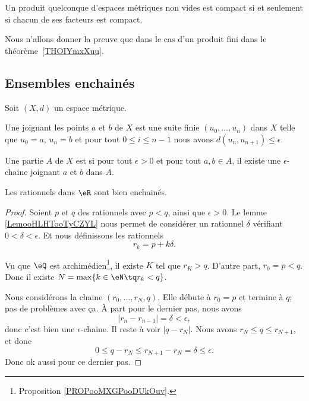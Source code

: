 \begin{theorem}[Tykhonov]\label{ThoFWXsQOZ}
    Un produit quelconque d'espaces métriques non vides est compact si et seulement si chacun de ses facteurs est compact.
\end{theorem}
Nous n'allons donner la preuve que dans le cas d'un produit fini dans le théorème~\ref{THOIYmxXuu}.

\subsection{Ensembles enchainés}

Soit \( (X,d)\) un espace métrique.
\begin{definition}
    Une  joignant les points \( a\) et \( b\) de \( X\) est une suite finie \( (u_0,\ldots, u_n)\) dans \( X\) telle que \( u_0=a\), \( u_n=b\) et pour tout \( 0\leq i\leq n-1\) nous avons \( d(u_n,u_{n+1})\leq \epsilon\).

    Une partie \( A\) de \( X\) est  si pour tout \( \epsilon>0\) et pour tout \( a,b\in A\), il existe une \( \epsilon\)-chaine joignant \( a\) et \( b\) dans $A$.
\end{definition}


\begin{lemma}
    Les rationnels dans \( \eR\) sont bien enchainés.
\end{lemma}

\begin{proof}
    Soient \( p\) et \( q\) des rationnels avec \( p<q\), ainsi que \( \epsilon>0\). Le lemme \ref{LemooHLHTooTyCZYL} nous permet de considérer un rationnel \( \delta\) vérifiant \( 0<\delta<\epsilon\). Et nous définissons les rationnels
    \begin{equation}
        r_k=p+k\delta.
    \end{equation}

    Vu que \( \eQ\) est archimédien\footnote{Proposition \ref{PROPooMXGPooDUkOuv}.}, il existe \( K\) tel que \( r_{K}>q\). D'autre part, \( r_0=p<q\). Donc il existe \( N=\max\{ k\in \eN\tq r_k<q \}\).

    Nous considérons la chaine \( (r_0,\ldots, r_N, q)\). Elle débute à \( r_0=p\) et termine à \( q\); pas de problèmes avec ça. À part pour le dernier pas, nous avons
    \begin{equation}
        | r_n-r_{n-1} |=\delta<\epsilon,
    \end{equation}
    donc c'est bien une \( \epsilon\)-chaine. Il reste à voir \( | q-r_N |\). Nous avons \( r_N\leq q\leq r_{N+1}\), et donc
    \begin{equation}
        0\leq q-r_N\leq r_{N+1}-r_N=\delta\leq \epsilon.
    \end{equation}
    Donc ok aussi pour ce dernier pas.
\end{proof}

